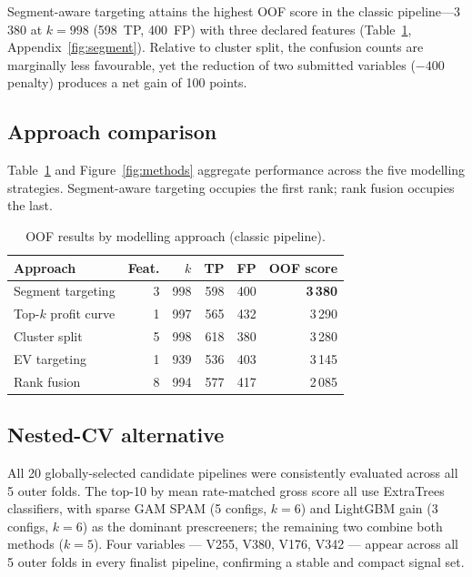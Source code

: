 \documentclass[cameraready]{Interspeech}
\begin{document}
Segment-aware targeting attains the highest OOF score in the classic pipeline---3\,380 at $k{=}998$ (598~TP, 400~FP) with three declared features (Table~\ref{tab:oof}, Appendix~\ref{fig:segment}).
Relative to cluster split, the confusion counts are marginally less favourable, yet the reduction of two submitted variables ($-400$ penalty) produces a net gain of 100 points.

\subsection{Approach comparison}
\label{res:compare}

Table~\ref{tab:oof} and Figure~\ref{fig:methods} aggregate performance across the five modelling strategies.
Segment-aware targeting occupies the first rank; rank fusion occupies the last.

\begin{table}[t]
    \centering
    \caption{OOF results by modelling approach (classic pipeline).}
    \label{tab:oof}
    \small
    \begin{tabular}{lrrrrr}
        \toprule
        Approach & Feat. & $k$ & TP & FP & OOF score \\
        \midrule
        Segment targeting  & 3 & 998 & 598 & 400 & \textbf{3\,380} \\
        Top-$k$ profit curve & 1 & 997 & 565 & 432 & 3\,290 \\
        Cluster split      & 5 & 998 & 618 & 380 & 3\,280 \\
        EV targeting       & 1 & 939 & 536 & 403 & 3\,145 \\
        Rank fusion        & 8 & 994 & 577 & 417 & 2\,085 \\
        \bottomrule
    \end{tabular}
\end{table}

\subsection{Nested-CV alternative}
\label{res:nested}

All 20 globally-selected candidate pipelines were consistently evaluated across all 5 outer
folds. The top-10 by mean rate-matched gross score all use ExtraTrees classifiers, with
sparse GAM SPAM (5 configs, $k{=}6$) and LightGBM gain (3 configs, $k{=}6$) as the
dominant prescreeners; the remaining two combine both methods ($k{=}5$).
Four variables --- V255, V380, V176, V342 --- appear across all 5 outer folds in every
finalist pipeline, confirming a stable and compact signal set.
\end{document}
